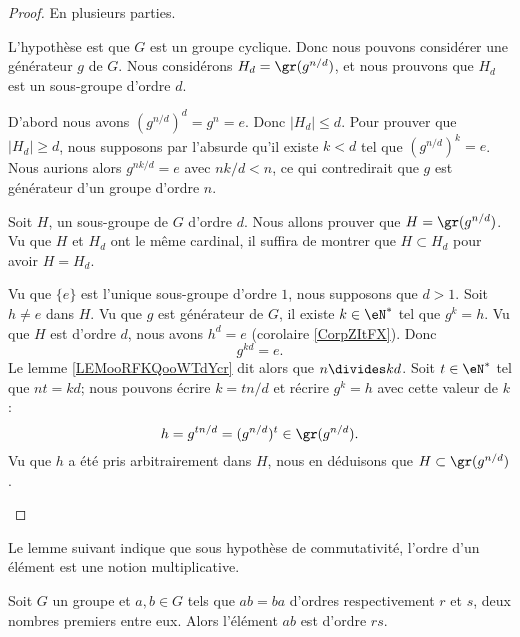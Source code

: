 \begin{proof}
	En plusieurs parties.
	\begin{subproof}
		\spitem[Existence]
		L'hypothèse est que \( G\) est un groupe cyclique. Donc nous pouvons considérer une générateur \( g\) de \( G\). Nous considérons \( H_d=\gr(g^{n/d})\), et nous prouvons que \( H_d\) est un sous-groupe d'ordre \( d\).

		D'abord nous avons \( (g^{n/d})^d=g^n=e\). Donc \( | H_d |\leq d\). Pour prouver que \( | H_d |\geq d\), nous supposons par l'absurde qu'il existe \( k<d\) tel que \( (g^{n/d})^k=e\). Nous aurions alors \( g^{nk/d}=e\) avec \( nk/d<n\), ce qui contredirait que \( g\) est générateur d'un groupe d'ordre \( n\).

		\spitem[Unicité]
		Soit \( H\), un sous-groupe de \( G\) d'ordre \( d\). Nous allons prouver que \( H=\gr(g^{n/d})\). Vu que \( H\) et \( H_d\) ont le même cardinal, il suffira de montrer que \( H\subset H_d\) pour avoir \( H=H_d\).

		Vu que \( \{ e \}\) est l'unique sous-groupe d'ordre \( 1\), nous supposons que \( d>1\). Soit \( h\neq e\) dans \( H\). Vu que \( g\) est générateur de \( G\), il existe \( k\in \eN^*\) tel que \( g^k=h\). Vu que \( H\) est d'ordre \( d\), nous avons \( h^d=e\) (corolaire \ref{CorpZItFX}). Donc
		\begin{equation}
			g^{kd}=e.
		\end{equation}
		Le lemme \ref{LEMooRFKQooWTdYcr} dit alors que \( n\divides kd\). Soit \( t\in \eN^*\) tel que \( nt=kd\); nous pouvons écrire \( k=tn/d\) et récrire \( g^k=h\) avec cette valeur de \( k\) :
		\begin{equation}
			h=g^{tn/d}=(g^{n/d})^t\in\gr(g^{n/d}).
		\end{equation}
		Vu que \( h\) a été pris arbitrairement dans \( H\), nous en déduisons que \( H\subset \gr(g^{n/d})\).
	\end{subproof}
\end{proof}

Le lemme suivant indique que sous hypothèse de commutativité, l'ordre d'un élément est une notion multiplicative.
\begin{lemma}    \label{LemyETtdy}
	Soit \( G\) un groupe et \( a,b\in G\) tels que \( ab=ba\) d'ordres respectivement \( r\) et \( s\), deux nombres premiers entre eux. Alors l'élément \( ab\) est d'ordre \( rs\).
\end{lemma}

